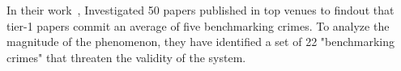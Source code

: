 In their work~\cite{van_der_kouwe_benchmarking_2018}, \citeauthor{van_der_kouwe_benchmarking_2018} Investigated 50 papers published in top venues
to findout that tier-1 papers commit an average of five benchmarking crimes.
To analyze the magnitude of the phenomenon, they have identified a set of 22 "benchmarking crimes" that threaten the validity of the system.




